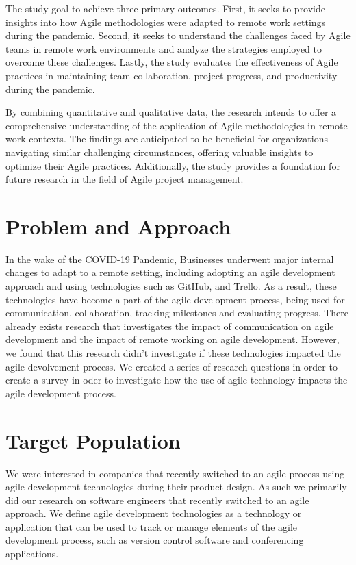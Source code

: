 \documentclass[conference]{IEEEtran}
\begin{document}
The study goal to achieve three primary outcomes. First, it seeks to provide insights into how Agile methodologies were adapted to remote work settings during the pandemic. Second, it seeks to understand the challenges faced by Agile teams in remote work environments and analyze the strategies employed to overcome these challenges. Lastly, the study evaluates the effectiveness of Agile practices in maintaining team collaboration, project progress, and productivity during the pandemic.

By combining quantitative and qualitative data, the research intends to offer a comprehensive understanding of the application of Agile methodologies in remote work contexts. The findings are anticipated to be beneficial for organizations navigating similar challenging circumstances, offering valuable insights to optimize their Agile practices. Additionally, the study provides a foundation for future research in the field of Agile project management.

\section{Problem and Approach}
In the wake of the COVID-19 Pandemic, Businesses underwent major internal changes to adapt to a remote setting, including adopting an agile development approach and using technologies such as GitHub, and Trello. As a result, these technologies have become a part of the agile development process, being used for communication, collaboration, tracking milestones and evaluating progress.  There already exists research that investigates the impact of communication on agile development and the impact of remote working on agile development. However, we found that this research didn’t investigate if these technologies impacted the agile devolvement process. We created a series of research questions in order to create a survey in oder to investigate how the use of agile technology impacts the agile development process.

\section{Target Population}
We were interested in companies that recently switched to an agile process using agile development technologies during their product design. As such we primarily did our research on software engineers that recently switched to an agile approach. We define agile development technologies as a technology or application that can be used to track or manage elements of the agile development process, such as version control software and conferencing applications. 
\end{document}
